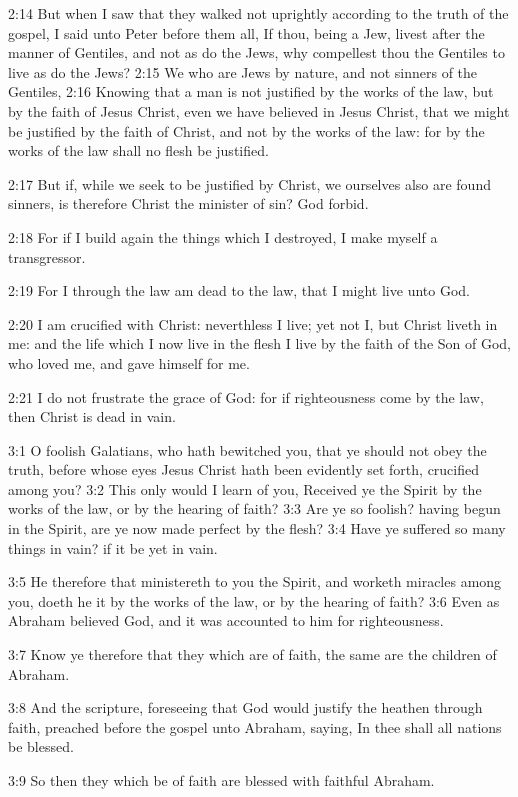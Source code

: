 2:14 But when I saw that they walked not uprightly according to the truth of the gospel, I said unto Peter before them all, If thou, being a Jew, livest after the manner of Gentiles, and not as do the Jews, why compellest thou the Gentiles to live as do the Jews?  2:15 We who are Jews by nature, and not sinners of the Gentiles, 2:16 Knowing that a man is not justified by the works of the law, but by the faith of Jesus Christ, even we have believed in Jesus Christ, that we might be justified by the faith of Christ, and not by the works of the law: for by the works of the law shall no flesh be justified.

2:17 But if, while we seek to be justified by Christ, we ourselves also are found sinners, is therefore Christ the minister of sin? God forbid.

2:18 For if I build again the things which I destroyed, I make myself a transgressor.

2:19 For I through the law am dead to the law, that I might live unto God.

2:20 I am crucified with Christ: neverthless I live; yet not I, but Christ liveth in me: and the life which I now live in the flesh I live by the faith of the Son of God, who loved me, and gave himself for me.

2:21 I do not frustrate the grace of God: for if righteousness come by the law, then Christ is dead in vain.

3:1 O foolish Galatians, who hath bewitched you, that ye should not obey the truth, before whose eyes Jesus Christ hath been evidently set forth, crucified among you?  3:2 This only would I learn of you, Received ye the Spirit by the works of the law, or by the hearing of faith?  3:3 Are ye so foolish? having begun in the Spirit, are ye now made perfect by the flesh?  3:4 Have ye suffered so many things in vain? if it be yet in vain.

3:5 He therefore that ministereth to you the Spirit, and worketh miracles among you, doeth he it by the works of the law, or by the hearing of faith?  3:6 Even as Abraham believed God, and it was accounted to him for righteousness.

3:7 Know ye therefore that they which are of faith, the same are the children of Abraham.

3:8 And the scripture, foreseeing that God would justify the heathen through faith, preached before the gospel unto Abraham, saying, In thee shall all nations be blessed.

3:9 So then they which be of faith are blessed with faithful Abraham.

